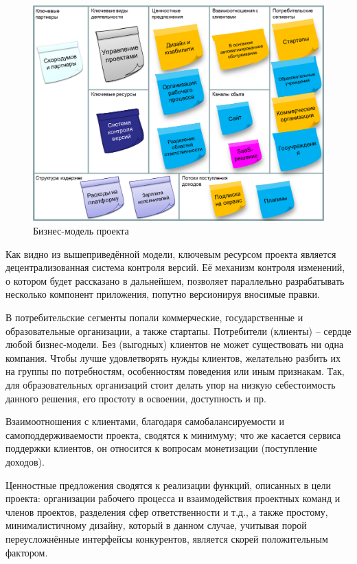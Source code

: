 \documentclass[14pt, a4paper]{extreport}
\begin{document}
\begin{figure}[!htb]
  \centering
    \includegraphics[scale=0.55]{../shared_images/business-model.png}
   \caption{Бизнес-модель проекта}
    \label{fig:start}
\end{figure}
  
Как видно из вышеприведённой модели, ключевым ресурсом проекта является децентрализованная система контроля версий. Её механизм контроля изменений, о котором будет рассказано в дальнейшем, позволяет параллельно разрабатывать несколько компонент приложения, попутно версионируя вносимые правки.

В потребительские сегменты попали коммерческие, государственные и образовательные организации, а также стартапы. Потребители (клиенты) – сердце любой бизнес-модели. Без (выгодных) клиентов не может существовать ни одна компания. Чтобы лучше удовлетворять нужды клиентов, желательно разбить их на группы по потребностям, особенностям поведения или иным признакам. Так, для образовательных организаций стоит делать упор на низкую себестоимость данного решения, его простоту в освоении, доступность и пр.

Взаимоотношения с клиентами, благодаря самобалансируемости и самоподдерживаемости проекта, сводятся к минимуму; что же касается сервиса поддержки клиентов, он относится к вопросам монетизации (поступление доходов).

Ценностные предложения сводятся к реализации функций, описанных в цели проекта: организации рабочего процесса и взаимодействия проектных команд и членов проектов, разделения сфер ответственности и т.д., а также простому, минималистичному дизайну, который в данном случае, учитывая порой переусложнённые интерфейсы конкурентов, является скорей положительным фактором.
\end{document}
